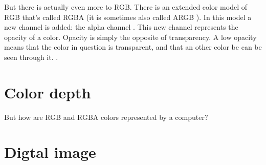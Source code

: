But there is actually even more to RGB. There is an extended color
model of RGB that's called RGBA (it is sometimes also
called ARGB ). In this model a new channel is added: the
alpha channel . This new channel represents the
opacity of a color. Opacity is simply the opposite of transparency.  A
low opacity means that the color in question is transparent,
 and that an other color be can be seen
through it.  \cite{porter84_compos_dig_img}.

\section{Color depth}
\label{sec:bit-depth}

But how are RGB and RGBA colors represented by a computer?

\section{Digtal image}
\label{sec:digtal-image}


\printbibliography[heading=subbibliography]
